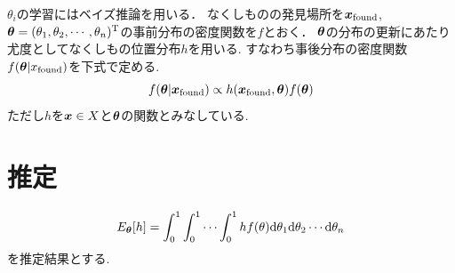 $ \theta_i $の学習にはベイズ推論を用いる．
なくしものの発見場所を$ \boldsymbol{x}_{\mathrm{found}} $, $ \boldsymbol{\theta} = (\theta_1 , \theta_2 , \cdots , \theta_n)^\mathrm{T} $の事前分布の密度関数を$ f $とおく．
$ \boldsymbol{\theta} $の分布の更新にあたり尤度としてなくしもの位置分布$ h $を用いる. 
すなわち事後分布の密度関数$ f(\boldsymbol{\theta} | x_{\mathrm{found}}) $を下式で定める. 
\begin{equation} \label{eq:new_f}
    f(\boldsymbol{\theta} | \boldsymbol{x}_{\mathrm{found}}) \propto h(\boldsymbol{x}_{\mathrm{found}} , \boldsymbol{\theta}) f(\boldsymbol{\theta})
\end{equation}
ただし$ h $を$ \boldsymbol{x} \in X $と$ \boldsymbol{\theta} $の関数とみなしている. 

\section{推定}
\begin{equation} \label{eq:exp}
    E_{\boldsymbol{\theta}} [h] = \int_{0}^{1} \int_{0}^{1} \cdots \int_{0}^{1} h f(\theta) \mathrm{d}\theta_1 \mathrm{d}\theta_2 \cdots \mathrm{d}\theta_n
\end{equation}
を推定結果とする. 
